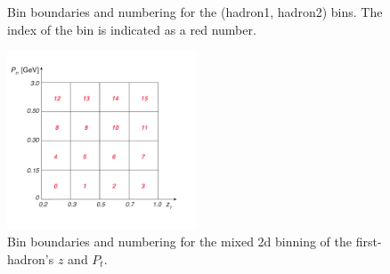 \begin{figure}[H]
\captionsetup[subfloat]{farskip=2pt,captionskip=1pt}
\centering
{}
\caption[Bin boundaries and numbering for the 2d binning in \(z\) or \(P_{t}\) of the two hadrons]{Bin boundaries and numbering for the (hadron1, hadron2) bins. The index of the bin is indicated as a red number.}
\label{fig:binnings}
\end{figure}

\begin{figure}[H]
    \centering
    \includegraphics[width=0.5\textwidth,natwidth=250,natheight=100]{figure_dataselection/zptbin.pdf}
    \caption{Bin boundaries and numbering for the mixed 2d binning of the first-hadron's $z$ and $P_t$.}
    \label{fig:zptbin}
\end{figure}



